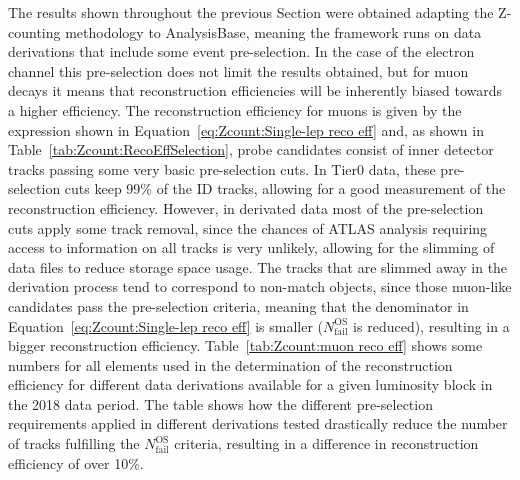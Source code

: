 The results shown throughout the previous Section were obtained adapting the Z-counting methodology to AnalysisBase, meaning the framework runs on data derivations that include some event pre-selection. In the case of the electron channel this pre-selection does not limit the results obtained, but for muon decays it means that reconstruction efficiencies will be inherently biased towards a higher efficiency. The reconstruction efficiency for muons is given by the expression shown in Equation~\ref{eq:Zcount:Single-lep reco eff} and, as shown in Table~\ref{tab:Zcount:RecoEffSelection}, probe candidates consist of inner detector tracks passing some very basic pre-selection cuts. In Tier0 data, these pre-selection cuts keep 99\% of the ID tracks, allowing for a good measurement of the reconstruction efficiency. However, in derivated data most of the pre-selection cuts apply some track removal, since the chances of ATLAS analysis requiring access to information on all tracks is very unlikely, allowing for the slimming of data files to reduce storage space usage. The tracks that are slimmed away in the derivation process tend to correspond to non-match objects, since those muon-like candidates pass the pre-selection criteria, meaning that the denominator in Equation~\ref{eq:Zcount:Single-lep reco eff} is smaller ($N^\text{OS}_\text{fail}$ is reduced), resulting in a bigger reconstruction efficiency. Table~\ref{tab:Zcount:muon reco eff} shows some numbers for all elements used in the determination of the reconstruction efficiency for different data derivations available for a given luminosity block in the 2018 data period. The table shows how the different pre-selection requirements applied in different derivations tested drastically reduce the number of tracks fulfilling the $N^\text{OS}_\text{fail}$ criteria, resulting in a difference in reconstruction efficiency of over 10\%.\\

